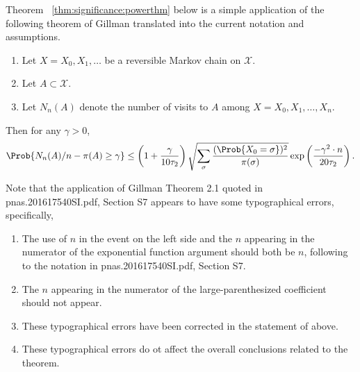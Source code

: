 \documentclass[12pt]{article}
\begin{document}


Theorem~%
\ref{thm:significance:powerthm} below is a simple application of the
following theorem of Gillman
\cite[Theorem 2.1]{gillman98} translated into the current notation and
assumptions.

\begin{theorem}
    \label{thm:significance:gillman}
    \begin{enumerate}
        \item
            Let \( X = X_0, X_1, \dots \) be a reversible Markov chain
            on \( \mathcal{X} \).
        \item
            Let \( A \subset \mathcal{X} \).
        \item
            Let \( N_n(A) \) denote the number of visits to \( A \)
            among \( X = X_0, X_1, \dots, X_n \).
    \end{enumerate}
    Then for any \( \gamma > 0 \),
    \[
        \Prob{N_n(A)/n - \pi(A) \ge \gamma} \le \left( 1 + \frac{\gamma}
        {10 \tau_2} \right) \sqrt{\sum_{\sigma} \frac{(\Prob{X_0 =
        \sigma})^2}{\pi (\sigma)}} \exp \left( \frac{-\gamma^2 \cdot n}{20
        \tau_2} \right).
    \]
\end{theorem}

\begin{remark}
  Note that the application of Gillman Theorem 2.1 quoted in
  pnas.201617540SI.pdf, Section S7 appears to have some typographical
  errors, specifically,
  \begin{enumerate}
  \item The use of \( n \) in the event on the left side and the \( n
    \) appearing in the numerator of the exponential function argument
    should both be \( n \), following to the notation in
    pnas.201617540SI.pdf, Section S7.
  \item The \( n \) appearing in the numerator of the
    large-parenthesized coefficient should not appear.
  \item These typographical errors have been corrected in the
    statement of above.
  \item These typographical errors do ot affect the overall
    conclusions related to the theorem.
  \end{enumerate}
\end{remark}
\end{document}
